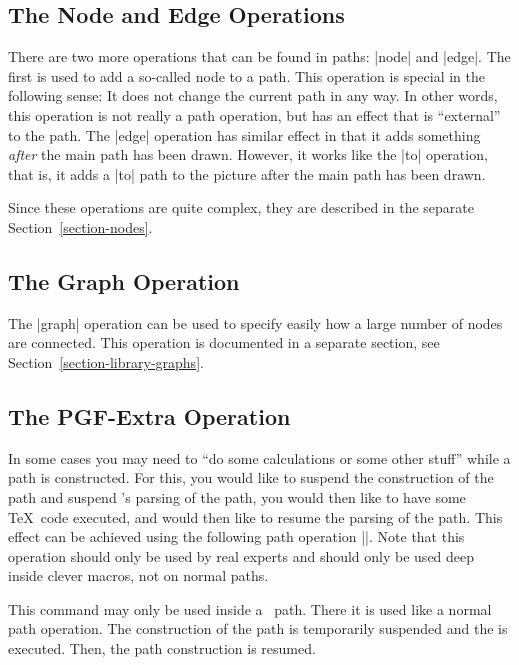 \subsection{The Node and Edge Operations}

There are two more operations that can be found in paths:
|node| and |edge|. The first is used to add a so-called node to a
path. This operation is special in the following sense: It does not
change the current path in any way. In other words, this operation
is not really a path operation, but has an effect that is
``external''  to the path. The |edge| operation has similar effect in
that it adds something \emph{after} the main path has been
drawn. However, it works like the |to| operation, that is, it adds a
|to| path to the picture after the main path has been drawn.

Since these operations are quite complex, they are described in the
separate Section~\ref{section-nodes}.


\subsection{The Graph Operation}

The |graph| operation can be used to specify easily how a large number
of nodes are connected. This operation is documented in a separate
section, see Section~\ref{section-library-graphs}.  


\subsection{The PGF-Extra Operation}

In some cases you may need to ``do some calculations or some other
stuff'' while a path is constructed. For this, you would like to
suspend the construction of the path and suspend \tikzname's parsing
of the path, you would then like to have some \TeX\ code executed, and
would then like to resume the parsing of the path. This effect can be
achieved using the following path operation |\pgfextra|. Note that
this operation should only be used by real experts and should only be
used deep inside clever macros, not on normal paths.

\begin{command}{\pgfextra{}}
  This command may only be used inside a \tikzname\ path. There it is
  used like a normal path operation. The construction of the path is
  temporarily suspended and the  is executed. Then, the
  path construction is resumed.

\begin{codeexample}[]
\newdimen\mydim
\begin{tikzpicture}
  \mydim=1cm
  \draw (0pt,\mydim) \pgfextra{\mydim=2cm} -- (0pt,\mydim);
\end{tikzpicture}
\end{codeexample}
\end{command}

